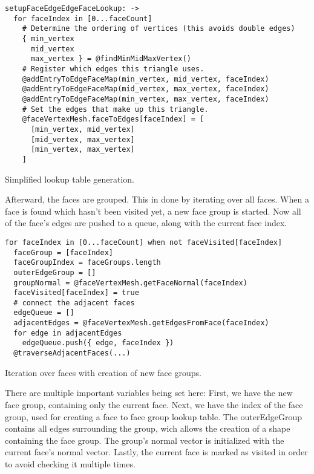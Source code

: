 \documentclass[../ClassicThesis.tex]{subfiles}
\begin{document}
\begin{listing}[ht]
\begin{verbatim}
setupFaceEdgeEdgeFaceLookup: ->
  for faceIndex in [0...faceCount]
    # Determine the ordering of vertices (this avoids double edges)
    { min_vertex
      mid_vertex
      max_vertex } = @findMinMidMaxVertex()
    # Register which edges this triangle uses.
    @addEntryToEdgeFaceMap(min_vertex, mid_vertex, faceIndex)
    @addEntryToEdgeFaceMap(mid_vertex, max_vertex, faceIndex)
    @addEntryToEdgeFaceMap(min_vertex, max_vertex, faceIndex)
    # Set the edges that make up this triangle.
    @faceVertexMesh.faceToEdges[faceIndex] = [
      [min_vertex, mid_vertex]
      [mid_vertex, max_vertex]
      [min_vertex, max_vertex]
    ]
\end{verbatim}
\caption{Simplified lookup table generation.}
\label{lst:coffeescript}
\end{listing}

Afterward, the faces are grouped. This in done by iterating over all faces. When a face is found which hasn't been visited yet, a new face group is started. Now all of the face's edges are pushed to a queue, along with the current face index.

\begin{listing}[ht]
\begin{verbatim}
for faceIndex in [0...faceCount] when not faceVisited[faceIndex]
  faceGroup = [faceIndex]
  faceGroupIndex = faceGroups.length
  outerEdgeGroup = []
  groupNormal = @faceVertexMesh.getFaceNormal(faceIndex)
  faceVisited[faceIndex] = true
  # connect the adjacent faces
  edgeQueue = []
  adjacentEdges = @faceVertexMesh.getEdgesFromFace(faceIndex)
  for edge in adjacentEdges
    edgeQueue.push({ edge, faceIndex })
  @traverseAdjacentFaces(...)
\end{verbatim}
\caption{Iteration over faces with creation of new face groups.}
\label{lst:coffeescript}
\end{listing}

There are multiple important variables being set here: First, we have the new face group, containing only the current face. Next, we have the index of the face group, used for creating a face to face group lookup table. The outerEdgeGroup contains all edges surrounding the group, wich allows the creation of a shape containing the face group. The group's normal vector is initialized with the current face's normal vector. Lastly, the current face is marked as visited in order to avoid checking it multiple times.
\end{document}
